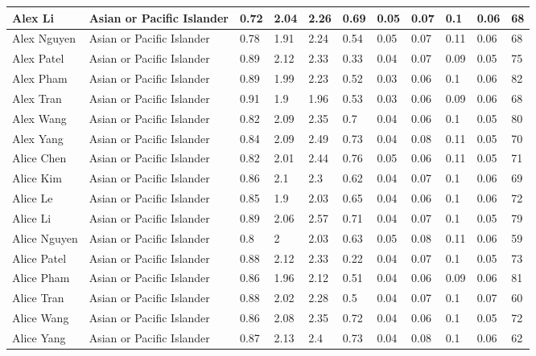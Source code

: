 \begin{table}[!ht]
\begin{tabular}{|l|l|l|l|l|l|l|l|l|l|l|}
        Alex Li & Asian or Pacific Islander & 0.72 & 2.04 & 2.26 & 0.69 & 0.05 & 0.07 & 0.1 & 0.06 & 68 \\ \hline
        Alex Nguyen & Asian or Pacific Islander & 0.78 & 1.91 & 2.24 & 0.54 & 0.05 & 0.07 & 0.11 & 0.06 & 68 \\ \hline
        Alex Patel & Asian or Pacific Islander & 0.89 & 2.12 & 2.33 & 0.33 & 0.04 & 0.07 & 0.09 & 0.05 & 75 \\ \hline
        Alex Pham & Asian or Pacific Islander & 0.89 & 1.99 & 2.23 & 0.52 & 0.03 & 0.06 & 0.1 & 0.06 & 82 \\ \hline
        Alex Tran & Asian or Pacific Islander & 0.91 & 1.9 & 1.96 & 0.53 & 0.03 & 0.06 & 0.09 & 0.06 & 68 \\ \hline
        Alex Wang & Asian or Pacific Islander & 0.82 & 2.09 & 2.35 & 0.7 & 0.04 & 0.06 & 0.1 & 0.05 & 80 \\ \hline
        Alex Yang & Asian or Pacific Islander & 0.84 & 2.09 & 2.49 & 0.73 & 0.04 & 0.08 & 0.11 & 0.05 & 70 \\ \hline
        Alice Chen & Asian or Pacific Islander & 0.82 & 2.01 & 2.44 & 0.76 & 0.05 & 0.06 & 0.11 & 0.05 & 71 \\ \hline
        Alice Kim & Asian or Pacific Islander & 0.86 & 2.1 & 2.3 & 0.62 & 0.04 & 0.07 & 0.1 & 0.06 & 69 \\ \hline
        Alice Le & Asian or Pacific Islander & 0.85 & 1.9 & 2.03 & 0.65 & 0.04 & 0.06 & 0.1 & 0.06 & 72 \\ \hline
        Alice Li & Asian or Pacific Islander & 0.89 & 2.06 & 2.57 & 0.71 & 0.04 & 0.07 & 0.1 & 0.05 & 79 \\ \hline
        Alice Nguyen & Asian or Pacific Islander & 0.8 & 2 & 2.03 & 0.63 & 0.05 & 0.08 & 0.11 & 0.06 & 59 \\ \hline
        Alice Patel & Asian or Pacific Islander & 0.88 & 2.12 & 2.33 & 0.22 & 0.04 & 0.07 & 0.1 & 0.05 & 73 \\ \hline
        Alice Pham & Asian or Pacific Islander & 0.86 & 1.96 & 2.12 & 0.51 & 0.04 & 0.06 & 0.09 & 0.06 & 81 \\ \hline
        Alice Tran & Asian or Pacific Islander & 0.88 & 2.02 & 2.28 & 0.5 & 0.04 & 0.07 & 0.1 & 0.07 & 60 \\ \hline
        Alice Wang & Asian or Pacific Islander & 0.86 & 2.08 & 2.35 & 0.72 & 0.04 & 0.06 & 0.1 & 0.05 & 72 \\ \hline
        Alice Yang & Asian or Pacific Islander & 0.87 & 2.13 & 2.4 & 0.73 & 0.04 & 0.08 & 0.1 & 0.06 & 62 \\ \hline

\end{tabular}
\end{table}
